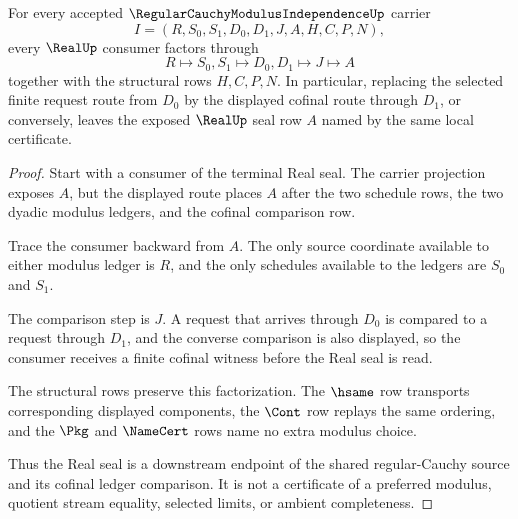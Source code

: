 \begin{theorem}
\label{thm:regular-cauchy-modulus-independence-real-seal-factorization}
For every accepted $\RegularCauchyModulusIndependenceUp$ carrier
$$
I=(R,S_0,S_1,D_0,D_1,J,A,H,C,P,N),
$$
every $\RealUp$ consumer factors through
$$
R\longmapsto S_0,S_1\longmapsto D_0,D_1\longmapsto J\longmapsto A
$$
together with the structural rows $H,C,P,N$. In particular, replacing the selected finite request route from $D_0$ by the displayed cofinal route through $D_1$, or conversely, leaves the exposed $\RealUp$ seal row $A$ named by the same local certificate.
\end{theorem}
\begin{proof}
Start with a consumer of the terminal Real seal. The carrier projection exposes $A$, but the displayed route places $A$ after the two schedule rows, the two dyadic modulus ledgers, and the cofinal comparison row.

Trace the consumer backward from $A$. The only source coordinate available to either modulus ledger is $R$, and the only schedules available to the ledgers are $S_0$ and $S_1$.

The comparison step is $J$. A request that arrives through $D_0$ is compared to a request through $D_1$, and the converse comparison is also displayed, so the consumer receives a finite cofinal witness before the Real seal is read.

The structural rows preserve this factorization. The $\hsame$ row transports corresponding displayed components, the $\Cont$ row replays the same ordering, and the $\Pkg$ and $\NameCert$ rows name no extra modulus choice.

Thus the Real seal is a downstream endpoint of the shared regular-Cauchy source and its cofinal ledger comparison. It is not a certificate of a preferred modulus, quotient stream equality, selected limits, or ambient completeness.
\end{proof}


